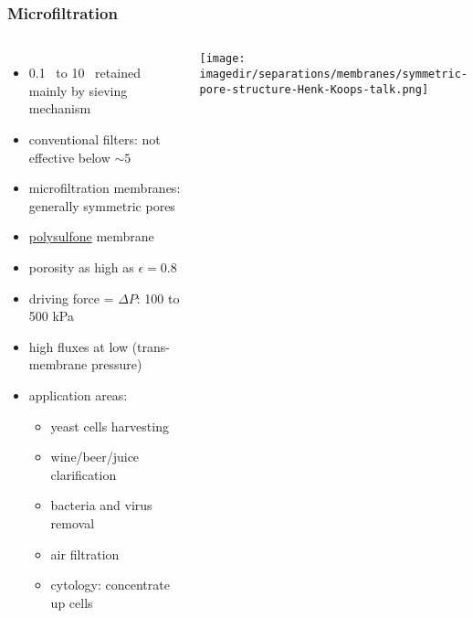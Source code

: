 \begin{frame}\frametitle{Microfiltration}
	\begin{columns}[t]
			\vspace{-20pt}
			\begin{itemize}
				\item	0.1 \micron ~to 10 \micron ~retained mainly by sieving mechanism
				\item	conventional filters: not effective below $\sim 5$~\micron
				\item	microfiltration membranes: generally symmetric pores
				\item	\href{http://en.wikipedia.org/wiki/Polysulfone}{polysulfone} membrane
				\item	porosity as high as $\epsilon = 0.8$
				\item	driving force = $\Delta P$: 100 to 500 kPa %
				\item	high fluxes at low {\color{purple}{TMP}} (trans-membrane pressure)
				\item	application areas:
					\begin{itemize}
						\item	yeast cells harvesting
						\item	wine/beer/juice clarification
						\item	bacteria and virus removal
						\item	air filtration
						\item	cytology: concentrate up cells
					\end{itemize}
			\end{itemize}
			\begin{center}
				\texttt{[image: \\imagedir/separations/membranes/symmetric-pore-structure-Henk-Koops-talk.png]}
			\end{center}
	\end{columns}	
\end{frame}

